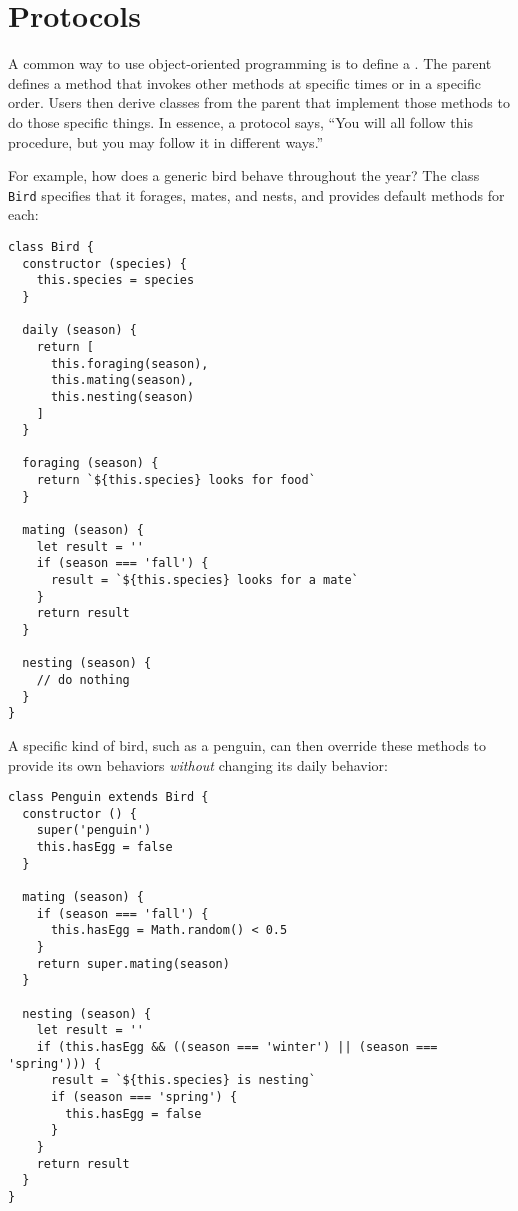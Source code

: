 
\section{Protocols}\label{s:oop-protocols}

A common way to use object-oriented programming is to define a .
The parent defines a method that invokes other methods at specific times or in a specific order.
Users then derive classes from the parent that implement those methods
to do those specific things.
In essence,
a protocol says,
``You will all follow this procedure, but you may follow it in different ways.''

For example,
how does a generic bird behave throughout the year?
The class \texttt{Bird} specifies that it forages, mates, and nests,
and provides default methods for each:

\begin{verbatim}
class Bird {
  constructor (species) {
    this.species = species
  }

  daily (season) {
    return [
      this.foraging(season),
      this.mating(season),
      this.nesting(season)
    ]
  }

  foraging (season) {
    return `${this.species} looks for food`
  }

  mating (season) {
    let result = ''
    if (season === 'fall') {
      result = `${this.species} looks for a mate`
    }
    return result
  }

  nesting (season) {
    // do nothing
  }
}
\end{verbatim}

A specific kind of bird,
such as a penguin,
can then override these methods to provide its own behaviors
\emph{without} changing its daily behavior:

\begin{verbatim}
class Penguin extends Bird {
  constructor () {
    super('penguin')
    this.hasEgg = false
  }

  mating (season) {
    if (season === 'fall') {
      this.hasEgg = Math.random() < 0.5
    }
    return super.mating(season)
  }

  nesting (season) {
    let result = ''
    if (this.hasEgg && ((season === 'winter') || (season === 'spring'))) {
      result = `${this.species} is nesting`
      if (season === 'spring') {
        this.hasEgg = false
      }
    }
    return result
  }
}
\end{verbatim}

